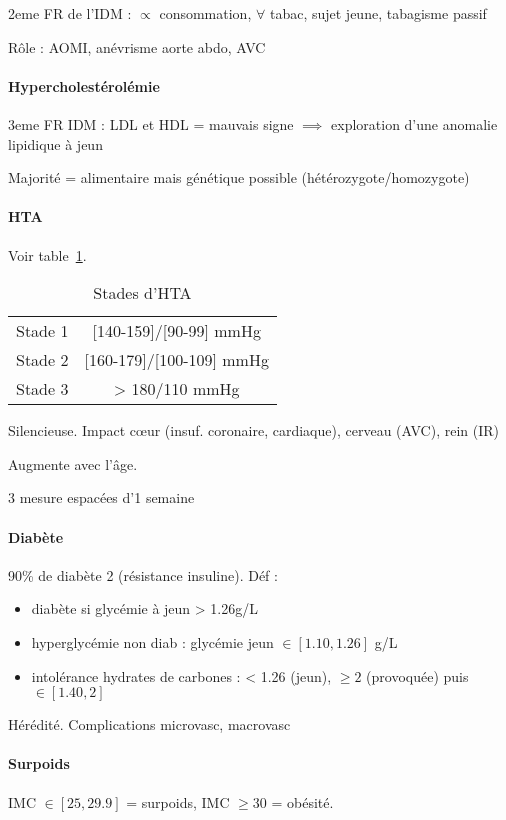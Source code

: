 2eme FR de l'IDM : $\propto$ consommation, $\forall$ tabac, sujet jeune, tabagisme passif

Rôle : AOMI, anévrisme aorte abdo, AVC

\paragraph{Hypercholestérolémie}
3eme FR IDM : \inc LDL et \dec HDL = mauvais signe $\implies$ exploration d'une
anomalie lipidique à jeun

Majorité = alimentaire mais génétique possible (hétérozygote/homozygote)

\paragraph{HTA}
Voir table~\ref{tab:hta_stades}.
\begin{table}
  \centering
  \begin{tabular}{cc}
      Stade 1 & [140-159]/[90-99] mmHg\\
Stade 2 & [160-179]/[100-109] mmHg\\
Stade 3 & > 180/110 mmHg
  \end{tabular}
  \caption{Stades d'HTA}
  \label{tab:hta_stades}
\end{table}

Silencieuse. Impact c\oe{}ur (insuf. coronaire, cardiaque), cerveau (AVC), rein (IR)

Augmente avec l'âge.

3 mesure espacées d'1 semaine

\paragraph{Diabète}
90\% de diabète 2 (résistance insuline). Déf :
\begin{itemize}
  \item diabète si glycémie à jeun > 1.26g/L
  \item hyperglycémie non diab : glycémie jeun $\in [1.10, 1.26]$ g/L
  \item intolérance hydrates de carbones : < 1.26 (jeun), $\ge 2$ (provoquée)
    puis $\in [1.40, 2]$
\end{itemize}
Hérédité. Complications microvasc, macrovasc

\paragraph{Surpoids}
IMC $\in [25, 29.9]$ = surpoids, IMC $\ge 30$ = obésité. 

